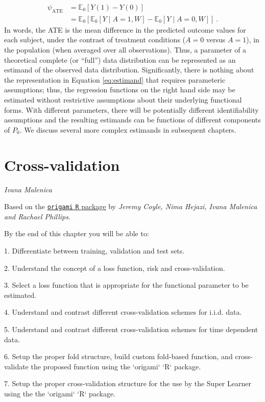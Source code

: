 \documentclass[
  12pt, krantz2,
]{krantz}
\newcommand{\passthrough}[1]{#1}
\newcommand{\E}{\mathbb{E}}
\newcommand{\1}{\mathbbm{1}}
\theoremstyle{definition}
\theoremstyle{definition}
\theoremstyle{definition}
\theoremstyle{definition}
\theoremstyle{remark}
\begin{document}
\begin{align}
  \psi_{\text{ATE}} &= \E_0[Y(1) - Y(0)] \\ \nonumber
                    &= \E_0 [\E_0[Y \mid A = 1, W] -
                       \E_0[Y \mid A = 0, W]] \ .
  \label{eq:estimand}
\end{align}
In words, the ATE is the mean difference in the predicted outcome values for
each subject, under the contrast of treatment conditions (\(A = 0\) versus \(A = 1\)), in the population (when averaged over all observations). Thus, a parameter
of a theoretical complete (or ``full'') data distribution can be represented as an
estimand of the observed data distribution. Significantly, there is nothing
about the representation in Equation \eqref{eq:estimand} that requires
parameteric assumptions; thus, the regression functions on the right hand side
may be estimated without restrictive assumptions about their underlying
functional forms. With different parameters, there will be potentially
different identifiability assumptions and the resulting estimands can be
functions of different components of \(P_0\). We discuss several more complex
estimands in subsequent chapters.

\hypertarget{origami}{%
\chapter{Cross-validation}\label{origami}}

\emph{Ivana Malenica}

Based on the \href{https://github.com/tlverse/origami}{\passthrough{\lstinline!origami!} \passthrough{\lstinline!R!} package}
by \emph{Jeremy Coyle, Nima Hejazi, Ivana Malenica and Rachael Phillips}.

\begin{VT1}



By the end of this chapter you will be able to:

1. Differentiate between training, validation and test sets.

2. Understand the concept of a loss function, risk and cross-validation.

3. Select a loss function that is appropriate for the functional parameter to be
   estimated.

4. Understand and contrast different cross-validation schemes for i.i.d. data.

5. Understand and contrast different cross-validation schemes for time dependent
   data.

6. Setup the proper fold structure, build custom fold-based function, and
   cross-validate the proposed function using the `origami` `R` package.

7. Setup the proper cross-validation structure for the use by the Super Learner
   using the the `origami` `R` package.

\end{VT1}
\end{document}
